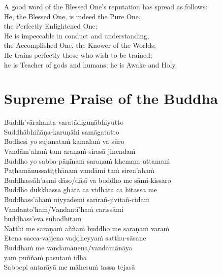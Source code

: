 \begin{leader}
\end{leader}

A good word of the Blessed One's reputation has spread as follows:\\
He, the Blessed One, is indeed the Pure One,\\
\vin the Perfectly Enlightened One;\\
He is impeccable in conduct and understanding,\\
\vin the Accomplished One, the Knower of the Worlds;\\
He trains perfectly those who wish to be trained;\\
\vin he is Teacher of gods and humans; he is Awake and Holy.

\section*{Supreme Praise of the Buddha}

\begin{leader}
\end{leader}

Buddh'vārahanta-varatādiguṇābhiyutto\\
Suddhābhiñāṇa-karuṇāhi samāgatatto\\
Bodhesi yo sujanataṁ kamalaṁ va sūro\\
Vandām'ahaṁ tam-araṇaṁ sirasā jinendaṁ\\
Buddho yo sabba-pāṇīnaṁ saraṇaṁ khemam-uttamaṁ\\
Paṭhamānussatiṭṭhānaṁ vandāmi taṁ siren'ahaṁ\\
Buddhassāh'asmi dāso/dāsī va buddho me sāmi-kissaro\\
Buddho dukkhassa ghātā ca vidhātā ca hitassa me\\
Buddhass'āhaṁ niyyādemi sarīrañ-jīvitañ-cidaṁ\\
Vandanto'haṁ/Vandantī'haṁ carissāmi\\
\vin buddhass'eva subodhitaṁ\\
Natthi me saraṇaṁ aññaṁ buddho me saraṇaṁ varaṁ\\
Etena sacca-vajjena vaḍḍheyyaṁ satthu-sāsane\\
Buddhaṁ me vandamānena/vandamānāya\\
\vin yaṁ puññaṁ pasutaṁ idha\\
Sabbepi antarāyā me māhesuṁ tassa tejasā

